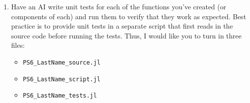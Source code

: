 \documentclass[12pt,english]{article}
\begin{document}
\begin{enumerate}
\begin{enumerate}
        \item \textbf{Estimate the structural parameters.}
        \begin{itemize}
            \item Add the output of your future value function as a new column in the original ``long panel'' data frame. The easiest way to do this is \texttt{df\_long = @transform(df\_long, :fv = fvt1)}
            \item Now use the \texttt{GLM} package to estimate the structural model. Make use of the ``offset'' keyword argument to add the future value term as another regressor whose coefficient is restricted to be 1. That is:
            \begin{verbatim}
theta_hat_ccp_glm = glm(@formula(Y ~ Odometer + Branded), 
                    df_long, Binomial(), LogitLink(), 
                    offset=df_long.fv)
                \end{verbatim}
        \end{itemize}
        \item Optionally, you can write your own function to estimate a binary logit where you restrict the offset term to have a coefficient of 1. (I will include this code in my solutions.)
    \item Wrap all of your code in an empty function as you've done with other problem sets. Prepend your wrapper function call (at the very end of the script) with \texttt{@time} so that you can time how long everything takes. (On my machine, everything took under 20 seconds.)
    \item Glory in the power of CCPs!
    \end{enumerate}



\item Have an AI write unit tests for each of the functions you've created (or components of each) and run them to verify that they work as expected. Best practice is to provide unit tests in a separate script that first reads in the source code before running the tests. Thus, I would like you to turn in three files:
    \begin{itemize}
        \item \texttt{PS6\_LastName\_source.jl}
        \item \texttt{PS6\_LastName\_script.jl}
        \item \texttt{PS6\_LastName\_tests.jl}
    \end{itemize}


\end{enumerate}
\end{document}
